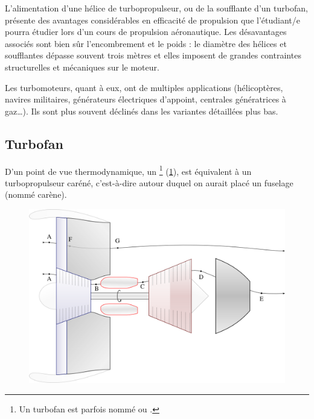 		L’alimentation d’une hélice de turbopropulseur, ou de la soufflante d’un turbofan, présente des avantages considérables en efficacité de propulsion que l’étudiant/e pourra étudier lors d’un cours de propulsion aéronautique. Les désavantages associés sont bien sûr l’encombrement et le poids : le diamètre des hélices et soufflantes dépasse souvent trois mètres et elles imposent de grandes contraintes structurelles et mécaniques sur le moteur.

		Les turbomoteurs, quant à eux, ont de multiples applications (hélicoptères, navires militaires, générateurs électriques d’appoint, centrales génératrices à gaz…). Ils sont plus souvent déclinés dans les variantes détaillées plus bas.


	\subsection{Turbofan}

		D’un point de vue thermodynamique, un \footnote{Un turbofan est parfois nommé  ou .} (\cref{fig_turbofan}), est équivalent à un turbopropulseur caréné, c’est-à-dire autour duquel on aurait placé un fuselage (nommé carène).
		
		\begin{figure}
			\begin{center}
				\includegraphics[scale=0.6]{images/circuit_turbofan.png}
			\end{center}
			\label{fig_turbofan}
		\end{figure}
		

